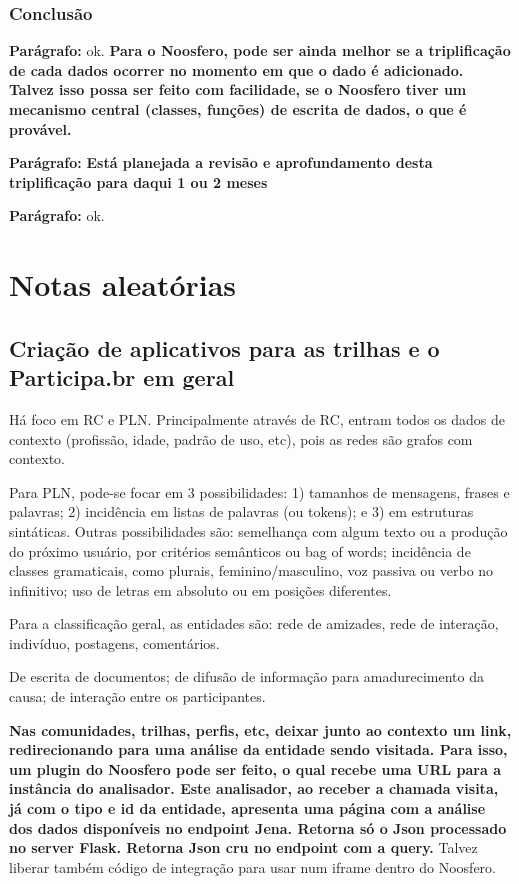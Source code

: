 \documentclass[12pt]{report}
\newcommand{\p}[0]{

\textbf{Parágrafo:}
}
\newcommand{\VV}[1]{{\bf \color{red} #1}}
\begin{document}
\section{Conclusão}
\p ok. \VV{Para o Noosfero, pode ser ainda melhor se a triplificação de cada dados ocorrer no momento em que o dado é adicionado. Talvez isso possa ser feito com facilidade, se o Noosfero tiver um mecanismo central (classes, funções) de escrita de dados, o que é provável.}
\p \VV{Está planejada a revisão e aprofundamento desta triplificação para daqui 1 ou 2 meses}
\p ok.


\part{Notas aleatórias}

\chapter{Criação de aplicativos para as trilhas e o Participa.br em geral}
Há foco em RC e PLN. Principalmente através de RC, entram todos os dados de contexto (profissão, idade, padrão de uso, etc), pois as redes são grafos com contexto.

Para PLN, pode-se focar em 3 possibilidades: 1) tamanhos de mensagens, frases e palavras; 2) incidência em listas de palavras (ou tokens); e 3) em estruturas sintáticas. Outras possibilidades são: semelhança com algum texto ou a produção do próximo usuário, por critérios semânticos ou bag of words; incidência de classes gramaticais, como plurais, feminino/masculino, voz passiva ou verbo no infinitivo; uso de letras em absoluto ou em posições diferentes.

Para a classificação geral, as entidades são: rede de amizades, rede de interação, indivíduo, postagens, comentários.

De escrita de documentos; de difusão de informação para amadurecimento da causa; de interação entre os participantes.

{\bf Nas comunidades, trilhas, perfis, etc, deixar junto ao contexto um link, redirecionando para uma análise da entidade sendo visitada. Para isso, um plugin do Noosfero pode ser feito, o qual recebe uma URL para a instância do analisador. Este analisador, ao receber a chamada visita, já com o tipo e id da entidade, apresenta uma página com a análise dos dados disponíveis no endpoint Jena. Retorna só o Json processado no server Flask. Retorna Json cru no endpoint com a query.} Talvez liberar também código de integração para usar num iframe dentro do Noosfero.
\end{document}
